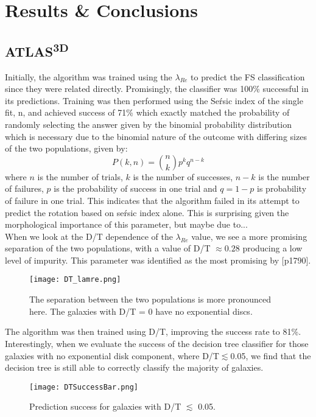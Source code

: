 \chapter{Results \& Conclusions}

\label{ch:results}

\section{ATLAS\textsuperscript{3D}}
Initially, the algorithm was trained using the $\lambda_{Re}$ to predict the FS classification since they were related directly. Promisingly, the classifier was 100\% successful in its predictions. Training was then performed using the Se\'rsic index of the single fit, n, and achieved success of 71\% which exactly matched the probability of randomly selecting the answer given by the binomial probability distribution which is necessary due to the binomial nature of the outcome with differing sizes of the two populations, given by\cite{simmons_2016}:
\begin{equation}
P(k,n) = \binom{n}{k}p^{k}q^{n-k}
\end{equation}
where $n$ is the number of trials, $k$ is the number of successes, $n-k$ is the number of failures, $p$ is the probability of success in one trial and $q=1-p$ is probability of failure in one trial. This indicates that the algorithm failed in its attempt to predict the rotation based on se\'rsic index alone. This is surprising given the morphological importance of this parameter, but maybe due to...\\
When we look at the D/T dependence of the $\lambda_{Re}$ value, we see a more promising separation of the two populations, with a value of D/T $\approx 0.28$ producing a low level of impurity. This parameter was identified as the most promising by \cite{Krajnovic2013}[p1790].
\begin{figure}[h]
	\centering
	\texttt{[image: DT\_lamre.png]}
	\caption{The separation between the two populations is more pronounced here. The galaxies with D/T = 0 have no exponential discs.
	}
	\label{fig:dtlamre}
\end{figure}
The algorithm was then trained using D/T, improving the success rate to 81\%. Interestingly, when we evaluate the success of the decision tree classifier for those galaxies with no exponential disk component, where D/T$\lesssim $0.05, we find that the decision tree is still able to correctly classify the majority of galaxies.
\begin{figure}[h!]
	\centering
	\texttt{[image: DTSuccessBar.png]}
	\caption{Prediction success for galaxies with D/T $\lesssim$ 0.05.}
	\label{fig:dtbar}
\end{figure}

